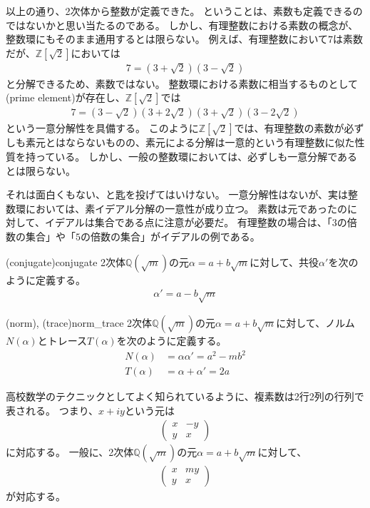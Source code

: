 以上の通り、2次体から整数が定義できた。
ということは、素数も定義できるのではないかと思い当たるのである。
しかし、有理整数における素数の概念が、整数環にもそのまま通用するとは限らない。
例えば、有理整数において$7$は素数だが、$\mathbb{Z}[\sqrt{2}]$においては
\begin{align*}
7 = (3 + \sqrt{2})(3 - \sqrt{2})
\end{align*}
と分解できるため、素数ではない。
整数環における素数に相当するものとして(prime element)が存在し、$\mathbb{Z}[\sqrt{2}]$では
\begin{align*}
7 = (3 - \sqrt{2})(3 + 2\sqrt{2})(3 + \sqrt{2})(3 - 2\sqrt{2})
\end{align*}
という一意分解性を具備する。
このように$\mathbb{Z}[\sqrt{2}]$では、有理整数の素数が必ずしも素元とはならないものの、素元による分解は一意的という有理整数に似た性質を持っている。
しかし、一般の整数環においては、必ずしも一意分解であるとは限らない。

それは面白くもない、と匙を投げてはいけない。
一意分解性はないが、実は整数環においては、素イデアル分解の一意性が成り立つ。
素数は元であったのに対して、イデアルは集合である点に注意が必要だ。
有理整数の場合は、「$3$の倍数の集合」や「$5$の倍数の集合」がイデアルの例である。

\begin{Defi}{(conjugate)}{conjugate}
2次体$\mathbb{Q}(\sqrt{m})$の元$\alpha=a+b\sqrt{m}$に対して、共役$\alpha'$を次のように定義する。
\begin{align*}
\alpha' = a - b\sqrt{m}
\end{align*}
\end{Defi}

\begin{Defi}{(norm), (trace)}{norm_trace}
2次体$\mathbb{Q}(\sqrt{m})$の元$\alpha=a+b\sqrt{m}$に対して、ノルム$N(\alpha)$とトレース$T(\alpha)$を次のように定義する。
\begin{align*}
N(\alpha) &= \alpha\alpha' = a^2 - mb^2\\
T(\alpha) &= \alpha + \alpha' = 2a
\end{align*}
\end{Defi}

高校数学のテクニックとしてよく知られているように、複素数は2行2列の行列で表される。
つまり、$x+iy$という元は
\begin{align*}
\begin{pmatrix}
x & -y \\
y & x
\end{pmatrix}
\end{align*}
に対応する。
一般に、2次体$\mathbb{Q}(\sqrt{m})$の元$\alpha=a+b\sqrt{m}$に対して、
\begin{align*}
\begin{pmatrix}
x & my \\
y & x
\end{pmatrix}
\end{align*}
が対応する。

